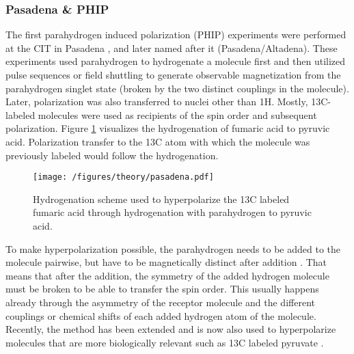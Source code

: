         \subsubsection{Pasadena \& PHIP}
        The first parahydrogen induced polarization (PHIP) experiments were performed at the CIT in Pasadena \cite{bowers_parahydrogen_1987-2}, and later named after it (Pasadena/Altadena). These experiments used parahydrogen to hydrogenate a molecule first and then utilized pulse sequences or field shuttling to generate observable magnetization from the parahydrogen singlet state (broken by the two distinct couplings in the molecule). Later, polarization was also transferred to nuclei other than 1H. Mostly, 13C-labeled molecules were used as recipients of the spin order and subsequent polarization. Figure \ref{fig:theory:pasadena} visualizes the hydrogenation of fumaric acid to pyruvic acid. Polarization transfer to the 13C atom with which the molecule was previously labeled would follow the hydrogenation.
        \begin{figure}
            \centering
            \texttt{[image: /figures/theory/pasadena.pdf]}
            \caption[Pasadena hyperpolarization]{Hydrogenation scheme used to hyperpolarize the 13C labeled fumaric acid through hydrogenation with parahydrogen to pyruvic acid.}
            \label{fig:theory:pasadena}
        \end{figure}
        To make hyperpolarization possible, the parahydrogen needs to be added to the molecule pairwise, but have to be magnetically distinct after addition \cite{eisenberg_parahydrogen-induced_1991}. That means that after the addition, the symmetry of the added hydrogen molecule must be broken to be able to transfer the spin order. This usually happens already through the asymmetry of the receptor molecule and the different couplings or chemical shifts of each added hydrogen atom of the molecule. Recently, the method has been extended and is now also used to hyperpolarize molecules that are more biologically relevant such as 13C labeled pyruvate \cite{cavallari_metabolic_2019}.
